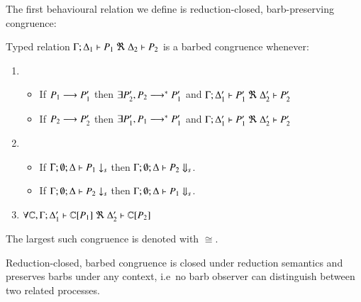 The first behavioural relation we define is reduction-closed, barb-preserving congruence:
%
\begin{definition}\rm
	Typed relation
	$\horel{\Gamma}{\Delta_1}{P_1}{\ \Re\ }{\Delta_2}{P_2}$
	is a barbed congruence whenever:
%
	\begin{enumerate}
		\item
		\begin{itemize}
			\item	If $P_1 \longrightarrow P_1'$ then $\exists P_2', P_2 \longrightarrow^* P_1'$ and
				$\horel{\Gamma}{\Delta_1'}{P_1'}{\ \Re\ }{\Delta_2'}{P_2'}$
			\item	If $P_2 \longrightarrow P_2'$ then $\exists P_1', P_1 \longrightarrow^* P_1'$ and
				$\horel{\Gamma}{\Delta_1'}{P_1'}{\ \Re\ }{\Delta_2'}{P_2'}$
		\end{itemize}

		\item
		\begin{itemize}
			\item	If $\Gamma;\emptyset;\Delta \vdash P_1 \downarrow_{s}$ then $\Gamma;\emptyset;\Delta \vdash P_2 \Downarrow_{s}$.
			\item	If $\Gamma;\emptyset;\Delta \vdash P_2 \downarrow_{s}$ then $\Gamma;\emptyset;\Delta \vdash P_1 \Downarrow_{s}$.
		\end{itemize}

		\item	$\forall \C, \horel{\Gamma}{\Delta_1'}{\context{\C}{P_1}}{\ \Re\ }{\Delta_2'}{\context{\C}{P_2}}$
	\end{enumerate}
%
	The largest such congruence is denoted with $\cong$.
\end{definition}
%
\noi Reduction-closed, barbed congruence is closed under reduction semantics and 
preserves barbs under any context, i.e~no barb observer can distinguish
between two related processes.

